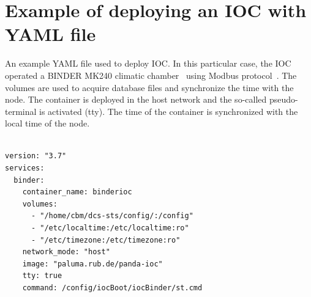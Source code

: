 \newpage
\appendix

\chapter{Example of deploying an IOC with YAML file}
An example YAML file used to deploy \gls{IOC}. In this particular case, the IOC operated a BINDER MK240 climatic chamber~\cite{binder} using Modbus protocol~\cite{modbus}. The volumes are used to acquire database files and synchronize the time with the node. The container is deployed in the host network and the so-called pseudo-terminal is activated (tty). The time of the container is synchronized with the local time of the node. 
\label{YAML}
\begin{verbatim}

version: "3.7"
services:
  binder:
    container_name: binderioc
    volumes:
      - "/home/cbm/dcs-sts/config/:/config"
      - "/etc/localtime:/etc/localtime:ro"
      - "/etc/timezone:/etc/timezone:ro"
    network_mode: "host"
    image: "paluma.rub.de/panda-ioc"
    tty: true
    command: /config/iocBoot/iocBinder/st.cmd
\end{verbatim}

